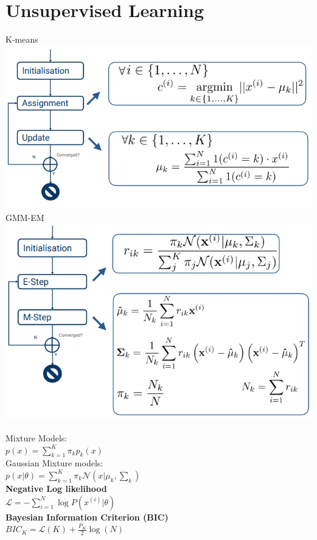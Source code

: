 \documentclass[a4paper, 10pt, twocolumn]{article}
\begin{document}
\section{Unsupervised Learning} 
K-means \\
\includegraphics[scale=0.5]{k-means.png} \\
GMM-EM \\
\includegraphics[scale=0.5]{GMM-EM.png} \\ \\
Mixture Models: \\$p(x) = \sum^K_{k=1} \pi_k p_k(x)$ \\
Gaussian Mixture models: \\$p(x|\theta) = \sum^K_{k=1} \pi_k \mathcal{N}(x|\mu_k, \sum_k)$ \\
\textbf{Negative Log likelihood} \\
$\mathcal{L} = -\sum^{N}_{i=1}\log P(x^{(i)}|\theta)$ \\
\textbf{Bayesian Information Criterion (BIC)}\\
$BIC_K = \mathcal{L}(K) + \frac{P_K}{2} \log(N) $ \\
\end{document}
